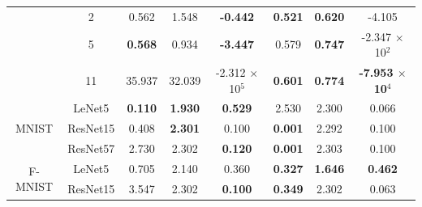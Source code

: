 \begin{table}[tbp]
{\begin{tabular}{|c|c|ccc|ccc|}
                                   & 2                                & \multicolumn{1}{c|}{0.562}          & \multicolumn{1}{c|}{1.548}          & \textbf{-0.442}          & \multicolumn{1}{c|}{\textbf{0.521}}  & \multicolumn{1}{c|}{\textbf{0.620}}  & -4.105                            \\ \cline{2-8} 
                                   & 5                                & \multicolumn{1}{c|}{\textbf{0.568}} & \multicolumn{1}{c|}{0.934}          & \textbf{-3.447}          & \multicolumn{1}{c|}{0.579}           & \multicolumn{1}{c|}{\textbf{0.747}}  & -2.347 $\times$ 10$^2$            \\ \cline{2-8} 
                                   & 11                               & \multicolumn{1}{c|}{35.937}         & \multicolumn{1}{c|}{32.039}         & -2.312 $\times$ 10$^{5}$ & \multicolumn{1}{c|}{\textbf{0.601}}  & \multicolumn{1}{c|}{\textbf{0.774}}  & \textbf{-7.953 $\times$ 10$^{4}$} \\ \hline
\multirow{3}{*}{MNIST}             & LeNet5                           & \multicolumn{1}{c|}{\textbf{0.110}} & \multicolumn{1}{c|}{\textbf{1.930}} & \textbf{0.529}           & \multicolumn{1}{c|}{2.530}           & \multicolumn{1}{c|}{2.300}           & 0.066                             \\ \cline{2-8} 
                                   & ResNet15                         & \multicolumn{1}{c|}{0.408}          & \multicolumn{1}{c|}{\textbf{2.301}} & 0.100                    & \multicolumn{1}{c|}{\textbf{0.001}}  & \multicolumn{1}{c|}{2.292}           & 0.100                             \\ \cline{2-8} 
                                   & ResNet57                         & \multicolumn{1}{c|}{2.730}          & \multicolumn{1}{c|}{2.302}          & \textbf{0.120}           & \multicolumn{1}{c|}{\textbf{0.001}}  & \multicolumn{1}{c|}{2.303}           & 0.100                             \\ \hline
\multirow{3}{*}{F-MNIST}           & LeNet5                           & \multicolumn{1}{c|}{0.705}          & \multicolumn{1}{c|}{2.140}          & 0.360                    & \multicolumn{1}{c|}{\textbf{0.327}}  & \multicolumn{1}{c|}{\textbf{1.646}}  & \textbf{0.462}                    \\ \cline{2-8} 
                                   & ResNet15                         & \multicolumn{1}{c|}{3.547}          & \multicolumn{1}{c|}{2.302}          & \textbf{0.100}           & \multicolumn{1}{c|}{\textbf{0.349}}  & \multicolumn{1}{c|}{2.302}           & 0.063                             \\ \cline{2-8} 

\end{tabular}}
\end{table}
